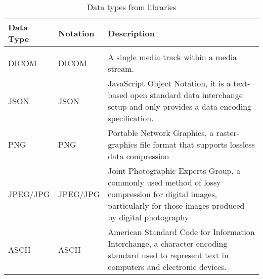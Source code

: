 \documentclass[12pt, titlepage]{article}
\begin{document}
\begin{table}[H]
  \centering
  \renewcommand{\arraystretch}{1.2}
  \noindent
  \begin{tabular}{l l p{7.5cm}}
    \toprule
    \textbf{Data Type}          & \textbf{Notation}           & \textbf{Description}                                                                                                                                                                                                                                            \\
    \midrule                                                                                                                                                                                    \\
    DICOM      & DICOM      & A single media track within a media stream.                                                                                                                                                                                                               \\
    JSON                  & JSON                  & JavaScript Object Notation, it is a text-based open standard data interchange setup and only provides a data encoding specification.                                                                                                                      \\
    PNG                  & PNG                  & Portable Network Graphics, a raster-graphics file format that supports lossless data compression                                                                                                                      \\
    JPEG/JPG                & JPEG/JPG                  & Joint Photographic Experts Group, a commonly used method of lossy compression for digital images, particularly for those images produced by digital photography                                                                                                                      \\
    ASCII                & ASCII                  & American Standard Code for Information Interchange, a character encoding standard used to represent text in computers and electronic devices.                                                                   \\
    \bottomrule
  \end{tabular}
  \caption{Data types from libraries}
\end{table}
\end{document}
